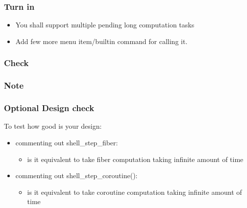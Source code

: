 \documentclass[]{book}
\begin{document}
\subsubsection*{Turn in}\label{turn-in-6}

\begin{itemize}
\itemsep1pt\parskip0pt
\item
  You shall support multiple pending long computation tasks
\item
  Add few more menu item/builtin command for calling it.
\end{itemize}

\subsubsection*{Check}\label{check-6}

\subsubsection*{Note}\label{note-8}

\subsubsection*{Optional Design check}\label{optional-design-check}

To test how good is your design:

\begin{itemize}
\itemsep1pt\parskip0pt
\item
  commenting out shell\_step\_fiber:

  \begin{itemize}
  \itemsep1pt\parskip0pt
  \item
    is it equivalent to take fiber computation taking infinite amount of
    time
  \end{itemize}
\item
  commenting out shell\_step\_coroutine():

  \begin{itemize}
  \itemsep1pt\parskip0pt
  \item
    is it equivalent to take coroutine computation taking infinite
    amount of time
  \end{itemize}
\end{itemize}
\end{document}
